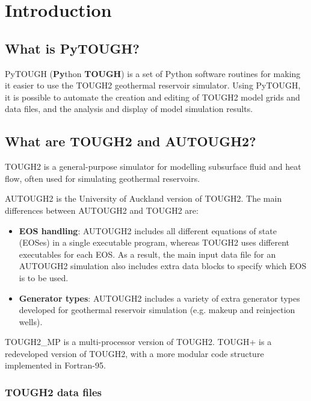 \chapter{Introduction}

\section{What is PyTOUGH?}

PyTOUGH (\textbf{Py}thon \textbf{TOUGH}) is a set of Python software routines for making it easier to use the TOUGH2 geothermal reservoir simulator. Using PyTOUGH, it is possible to automate the creation and editing of TOUGH2 model grids and data files, and the analysis and display of model simulation results.

\section{What are TOUGH2 and AUTOUGH2?}

TOUGH2 \citep{tough2} is a general-purpose simulator for modelling subsurface fluid and heat flow, often used for simulating geothermal reservoirs.

AUTOUGH2 is the University of Auckland version of TOUGH2.  The main differences between AUTOUGH2 and TOUGH2 are:

\begin{itemize}
  \item \textbf{EOS handling}: AUTOUGH2 includes all different equations of state (EOSes) in a single executable program, whereas TOUGH2 uses different executables for each EOS.  As a result, the main input data file for an AUTOUGH2 simulation also includes extra data blocks to specify which EOS is to be used.
  \item \textbf{Generator types}: AUTOUGH2 includes a variety of extra generator types developed for geothermal reservoir simulation (e.g. makeup and reinjection wells).
\end{itemize}

TOUGH2\_MP \citep{tough2mp} is a multi-processor version of TOUGH2.  TOUGH+ is a redeveloped version of TOUGH2, with a more modular code structure implemented in Fortran-95.

\subsection{TOUGH2 data files}

